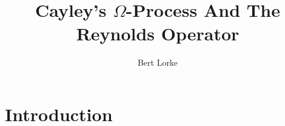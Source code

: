 \documentclass{article}
\title{Cayley's $\Omega$-Process And The Reynolds Operator}
\author{Bert Lorke}
\theoremstyle{prrt}
\begin{document}


\maketitle
\tableofcontents

\section{Introduction}





% 
\end{document}
